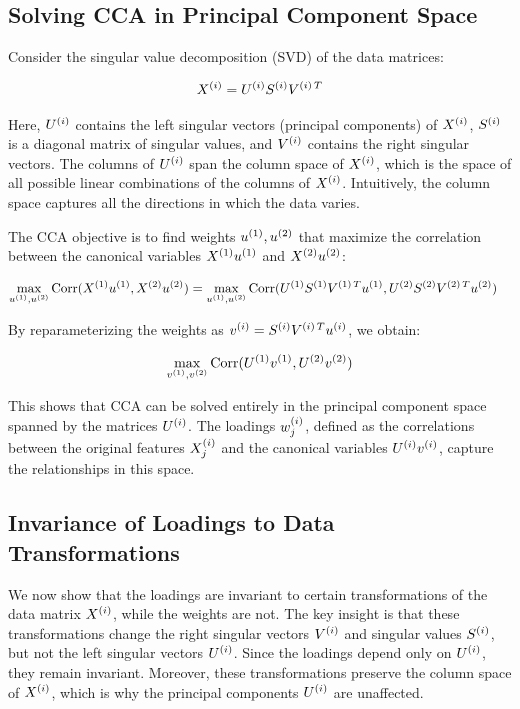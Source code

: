 \subsection{Solving CCA in Principal Component Space}
Consider the singular value decomposition (SVD) of the data matrices:

\begin{align}
X^{(i)} = U^{(i)}S^{(i)}V^{(i)\,T} \label{eq:svd}
\end{align}

Here, $U^{(i)}$ contains the left singular vectors (principal components) of $X^{(i)}$, $S^{(i)}$ is a diagonal matrix of singular values, and $V^{(i)}$ contains the right singular vectors. The columns of $U^{(i)}$ span the column space of $X^{(i)}$, which is the space of all possible linear combinations of the columns of $X^{(i)}$. Intuitively, the column space captures all the directions in which the data varies.

The CCA objective is to find weights $u^{(1)}, u^{(2)}$ that maximize the correlation between the canonical variables $X^{(1)}u^{(1)}$ and $X^{(2)}u^{(2)}$:

\begin{align}
\max_{u^{(1)}, u^{(2)}} \operatorname{Corr}(X^{(1)}u^{(1)}, X^{(2)}u^{(2)}) &= \max_{u^{(1)}, u^{(2)}} \operatorname{Corr}(U^{(1)}S^{(1)}V^{(1)\,T}u^{(1)}, U^{(2)}S^{(2)}V^{(2)\,T}u^{(2)}) \label{eq:cca_obj}
\end{align}

By reparameterizing the weights as $v^{(i)} = S^{(i)}V^{(i)\,T}u^{(i)}$, we obtain:

\begin{align}
\max_{v^{(1)}, v^{(2)}} \operatorname{Corr}(U^{(1)}v^{(1)}, U^{(2)}v^{(2)}) \label{eq:reparam}
\end{align}

This shows that CCA can be solved entirely in the principal component space spanned by the matrices $U^{(i)}$. The loadings $w^{(i)}_j$, defined as the correlations between the original features $X^{(i)}_j$ and the canonical variables $U^{(i)}v^{(i)}$, capture the relationships in this space.

\subsection{Invariance of Loadings to Data Transformations}

We now show that the loadings are invariant to certain transformations of the data matrix $X^{(i)}$, while the weights are not. The key insight is that these transformations change the right singular vectors $V^{(i)}$ and singular values $S^{(i)}$, but not the left singular vectors $U^{(i)}$. Since the loadings depend only on $U^{(i)}$, they remain invariant. Moreover, these transformations preserve the column space of $X^{(i)}$, which is why the principal components $U^{(i)}$ are unaffected.

